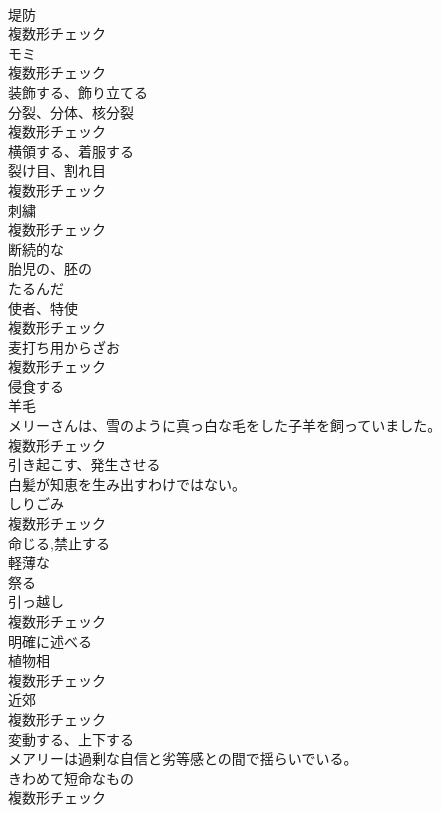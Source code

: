 \documentclass[8pt]{extreport}
\begin{document}
\begin{CJK}{UTF8}{min}
\\	[名詞]	堤防	
\\	複数形チェック
\\	[名詞]	モミ	
\\	複数形チェック
\\	[動詞]	装飾する、飾り立てる	
\\	[名詞]	分裂、分体、核分裂	
\\	複数形チェック
\\	[動詞]	横領する、着服する	
\\	[名詞]	裂け目、割れ目	
\\	複数形チェック
\\	[名詞]	刺繍	
\\	複数形チェック
\\	[形容詞]	断続的な	
\\	[形容詞]	胎児の、胚の	
\\	[形容詞]	たるんだ	
\\	[名詞]	使者、特使	
\\	複数形チェック
\\	[名詞]	⻨打ち用からざお	
\\	複数形チェック
\\	[動詞]	侵食する	
\\	[名詞]	羊毛	
\\	メリーさんは、雪のように真っ白な毛をした子羊を飼っていました。	
\\	複数形チェック
\\	[動詞]	引き起こす、発生させる	
\\	白髪が知恵を生み出すわけではない。	
\\	[名詞]	しりごみ	
\\	複数形チェック
\\	[動詞]	命じる,禁止する	
\\	[形容詞]	軽薄な	
\\	[動詞]	祭る	
\\	[名詞]	引っ越し	
\\	複数形チェック
\\	[動詞]	明確に述べる	
\\	[名詞]	植物相	
\\	複数形チェック
\\	[名詞]	近郊	
\\	複数形チェック
\\	[動詞]	変動する、上下する	
\\	メアリーは過剰な自信と劣等感との間で揺らいでいる。	
\\	[名詞]	きわめて短命なもの	
\\	複数形チェック

\end{CJK}
\end{document}
